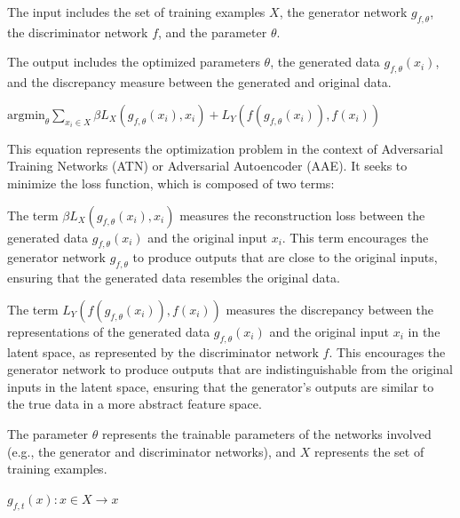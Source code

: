 
The input includes the set of training examples $X$, the generator network $g_{f,\theta}$, the discriminator network $f$, and the parameter $\theta$.

The output includes the optimized parameters $\theta$, the generated data $g_{f,\theta}(x_i)$, and the discrepancy measure between the generated and original data.

$\text{argmin}_{\theta} \sum_{x_i \in X} \beta L_X(g_{f,\theta}(x_i), x_i) + L_Y(f(g_{f,\theta}(x_i)), f(x_i))$

This equation represents the optimization problem in the context of Adversarial Training Networks (ATN) or Adversarial Autoencoder (AAE). It seeks to minimize the loss function, which is composed of two terms:

The term $\beta L_X(g_{f,\theta}(x_i), x_i)$ measures the reconstruction loss between the generated data $g_{f,\theta}(x_i)$ and the original input $x_i$. This term encourages the generator network $g_{f,\theta}$ to produce outputs that are close to the original inputs, ensuring that the generated data resembles the original data.

The term $L_Y(f(g_{f,\theta}(x_i)), f(x_i))$ measures the discrepancy between the representations of the generated data $g_{f,\theta}(x_i)$ and the original input $x_i$ in the latent space, as represented by the discriminator network $f$. This encourages the generator network to produce outputs that are indistinguishable from the original inputs in the latent space, ensuring that the generator's outputs are similar to the true data in a more abstract feature space.

The parameter $\theta$ represents the trainable parameters of the networks involved (e.g., the generator and discriminator networks), and $X$ represents the set of training examples.

$g_{f,t}(x) : x \in X \rightarrow x$